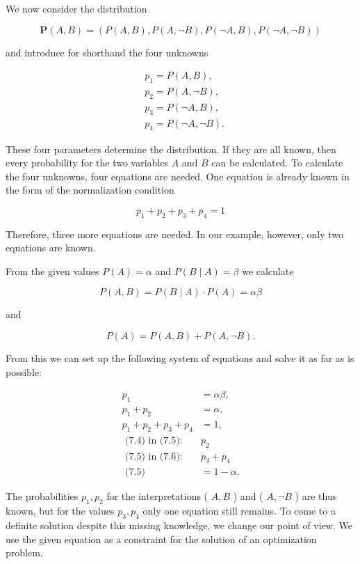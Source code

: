 \documentclass[10pt]{article}
\begin{document}
We now consider the distribution

$$
\boldsymbol{P}(A, B)=(P(A, B), P(A, \neg B), P(\neg A, B), P(\neg A, \neg B))
$$

and introduce for shorthand the four unknowns

$$
\begin{aligned}
& p_{1}=P(A, B), \\
& p_{2}=P(A, \neg B), \\
& p_{3}=P(\neg A, B), \\
& p_{4}=P(\neg A, \neg B) .
\end{aligned}
$$

These four parameters determine the distribution. If they are all known, then every probability for the two variables $A$ and $B$ can be calculated. To calculate the four unknowns, four equations are needed. One equation is already known in the form of the normalization condition

$$
p_{1}+p_{2}+p_{3}+p_{4}=1
$$

Therefore, three more equations are needed. In our example, however, only two equations are known.

From the given values $P(A)=\alpha$ and $P(B \mid A)=\beta$ we calculate

$$
P(A, B)=P(B \mid A) \cdot P(A)=\alpha \beta
$$

and

$$
P(A)=P(A, B)+P(A, \neg B) .
$$

From this we can set up the following system of equations and solve it as far as is possible:


\begin{align*}
p_{1} & =\alpha \beta,  \tag{7.4}\\
p_{1}+p_{2} & =\alpha,  \tag{7.5}\\
p_{1}+p_{2}+p_{3}+p_{4} & =1,  \tag{7.6}\\
\text { (7.4) in (7.5): } & p_{2}  \tag{7.7}\\
\text { (7.5) in (7.6): } & p_{3}+p_{4}  \tag{7.8}\\
\text { (7.5) } & =1-\alpha .
\end{align*}


The probabilities $p_{1}, p_{2}$ for the interpretations ( $A, B$ ) and ( $A, \neg B$ ) are thus known, but for the values $p_{3}, p_{4}$ only one equation still remains. To come to a definite solution despite this missing knowledge, we change our point of view. We use the given equation as a constraint for the solution of an optimization problem.
\end{document}
